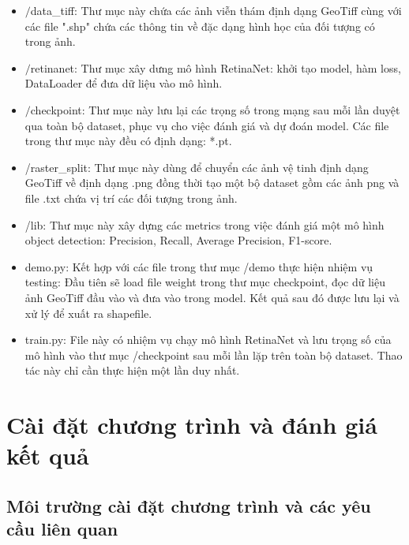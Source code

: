 \documentclass[a4paper, 12pt]{report}
\begin{document}
\begin{itemize}
	\item $/$data\_tiff: Thư mục này chứa các ảnh viễn thám định dạng GeoTiff cùng với các file ".shp" chứa các thông tin về đặc dạng hình học của đối tượng có trong ảnh.
	\item $/$retinanet: Thư mục xây dưng mô hình RetinaNet: khởi tạo model,  hàm loss, DataLoader để đưa dữ liệu vào mô hình.
	\item $/$checkpoint: Thư mục này lưu lại các trọng số trong mạng sau mỗi lần duyệt qua toàn bộ dataset, phục vụ cho việc đánh giá và dự đoán model. Các file trong thư mục này đều có định dạng: *.pt.
	\item /raster\_split: Thư mục này dùng để chuyển các ảnh vệ tinh định dạng GeoTiff về định dạng .png đồng thời tạo một bộ dataset gồm các ảnh png và file .txt chứa vị trí các đối tượng trong ảnh.
	\item /lib: Thư mục này xây dựng các metrics trong việc đánh giá một mô hình object detection: Precision, Recall, Average Precision, F1-score.
	\item demo.py: Kết hợp với các file trong thư mục /demo thực hiện nhiệm vụ testing: Đầu tiên sẽ load file weight trong thư mục checkpoint, đọc dữ liệu ảnh GeoTiff đầu vào và đưa vào trong model. Kết quả sau đó được lưu lại và xử lý để xuất ra shapefile.
	\item train.py: File này có nhiệm vụ chạy mô hình RetinaNet và lưu trọng số của mô hình vào thư mục /checkpoint sau mỗi lần lặp trên toàn  bộ dataset. Thao tác này chỉ cần thực hiện một lần duy nhất.
\end{itemize}



\chapter{Cài đặt chương trình và đánh giá kết quả}

\section{Môi trường cài đặt chương trình và các yêu cầu liên quan}
\end{document}

